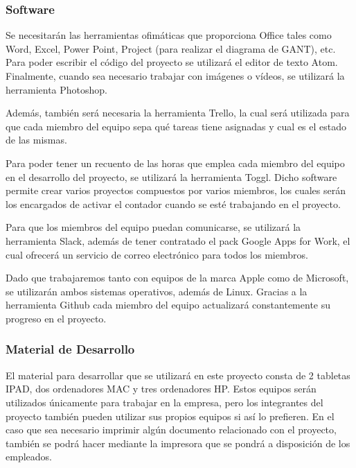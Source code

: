 \subsubsection{Software}
\par{Se necesitarán las herramientas ofimáticas que proporciona Office tales como Word, Excel, Power Point, Project (para realizar el diagrama de GANT), etc. Para poder escribir el código del proyecto se utilizará el editor de texto Atom. Finalmente, cuando sea necesario trabajar con imágenes o vídeos, se utilizará la herramienta Photoshop.}
\par{Además, también será necesaria la herramienta Trello, la cual será utilizada para que cada miembro del equipo sepa qué tareas tiene asignadas y cual es el estado  de las mismas. }
\par{Para poder tener un recuento de las horas que emplea cada miembro del equipo en el desarrollo del proyecto, se utilizará la herramienta Toggl. Dicho software permite crear varios proyectos compuestos por varios miembros, los cuales serán los encargados de activar el contador cuando se esté trabajando en el proyecto.}
\par{Para que los miembros del equipo puedan comunicarse, se utilizará la herramienta Slack, además de tener contratado el pack Google Apps for Work, el cual ofrecerá un servicio de correo electrónico para todos los miembros. }
\par{Dado que trabajaremos tanto con equipos de la marca Apple como de Microsoft, se utilizarán ambos sistemas operativos, además de Linux. Gracias a la herramienta Github cada miembro del equipo actualizará constantemente su progreso en el proyecto.}

\subsubsection{Material de Desarrollo}
\par El material para desarrollar que se utilizará en este proyecto consta de 2 tabletas IPAD, dos ordenadores MAC y tres ordenadores HP. Estos equipos serán utilizados únicamente para trabajar en la empresa, pero los integrantes del proyecto también pueden utilizar sus propios equipos si así lo prefieren. En el caso que sea necesario imprimir algún documento relacionado con el proyecto, también se podrá hacer mediante la impresora que se pondrá a disposición de los empleados. 
